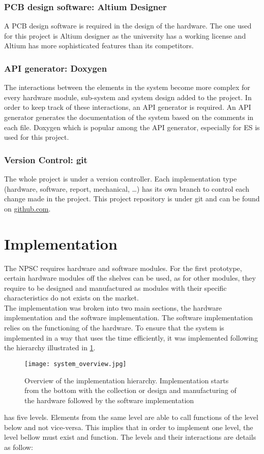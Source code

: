  \subsubsection{PCB design software: Altium Designer}
A PCB design software is required in the design of the hardware. The one used for this project is Altium designer as the university has a working license and Altium has more sophisticated features than its competitors. 
\subsubsection{API generator: Doxygen}
The interactions between the elements in the system become more complex for every hardware module, sub-system and system design added to the project. In order to keep track of these interactions, an API generator is required. An API generator generates the documentation of the system based on the comments in each file. Doxygen which is popular among the API generator, especially for ES is used for this project.
\subsubsection{Version Control: git}
The whole project is under a version controller. Each implementation type (hardware, software, report, mechanical, \ldots) has its own branch to control each change made in the project. This project repository is under git and can be found on \href{https://github.com/Kojey/NPSC}{github.com}. 
\section{Implementation}
The NPSC requires hardware and software modules. For the first prototype, certain hardware modules off the shelves can be used, as for other modules, they require to be designed and manufactured as modules with their specific characteristics do not exists on the market.\\
The implementation was broken into two main sections, the hardware implementation and the software implementation. The software implementation relies on the functioning of the hardware. To ensure that the system is implemented in a way that uses the time efficiently, it was implemented following the hierarchy illustrated in \cref{fig:system_overview}. 
\begin{figure}[ht]
\centering
\texttt{[image: system\_overview.jpg]}
\caption{Overview of the implementation hierarchy. Implementation starts from the bottom with the collection or design and manufacturing of the hardware followed by the software implementation}
\label{fig:system_overview}
\end{figure}
 has five levels. Elements from the same level are able to call functions of the level below and not vice-versa. This implies that in order to implement one level, the level bellow must exist and function. The levels and their interactions are details as follow:
